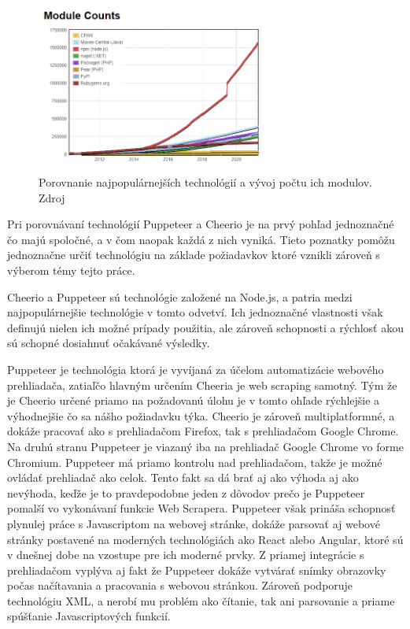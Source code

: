 \begin{figure}[hbt]
	\centering
	\includegraphics[width=0.7\textwidth]{obrazky-figures/modules.png}
	\caption{Porovnanie najpopulárnejších technológií a vývoj počtu ich modulov. Zdroj \cite{Moduleco}}
	\label{Moduleco_img}
\end{figure}

\bigskip

Pri porovnávaní technológií Puppeteer a Cheerio je na prvý pohľad jednoznačné čo majú spoločné, a v čom naopak každá z nich vyniká. Tieto poznatky pomôžu jednoznačne určiť technológiu na základe požiadavkov ktoré vznikli zároveň s výberom témy tejto práce.

Cheerio a Puppeteer sú technológie založené na Node.js, a patria medzi najpopulárnejšie technológie v tomto odvetví. Ich jednoznačné vlastnosti však definujú nielen ich možné prípady použitia, ale zároveň schopnosti a rýchlosť akou sú schopné dosiahnuť očakávané výsledky. 

Puppeteer je technológia ktorá je vyvíjaná za účelom automatizácie webového prehliadača, zatiaľčo hlavným určením Cheeria je web scraping samotný. Tým že je Cheerio určené priamo na požadovanú úlohu je v tomto ohľade rýchlejšie a výhodnejšie čo sa nášho požiadavku týka. Cheerio je zároveň multiplatformné, a dokáže pracovať ako s prehliadačom Firefox, tak s prehliadačom Google Chrome. Na druhú stranu Puppeteer je viazaný iba na prehliadač Google Chrome vo forme Chromium. Puppeteer má priamo kontrolu nad prehliadačom, takže je možné ovládať prehliadač ako celok. Tento fakt sa dá brať aj ako výhoda aj ako nevýhoda, keďže je to pravdepodobne jeden z dôvodov prečo je Puppeteer pomalší vo vykonávaní funkcie Web Scrapera. Puppeteer však prináša schopnosť plynulej práce s Javascriptom na webovej stránke, dokáže parsovať aj webové stránky postavené na moderných technológiách ako React alebo Angular, ktoré sú v dnešnej dobe na vzostupe pre ich moderné prvky. Z priamej integrácie s prehliadačom vyplýva aj fakt že Puppeteer dokáže vytvárať snímky obrazovky počas načítavania a pracovania s webovou stránkou. Zároveň podporuje technológiu XML, a nerobí mu problém ako čítanie, tak ani parsovanie a priame spúšťanie Javascriptových funkcií. \cite{Differences}


